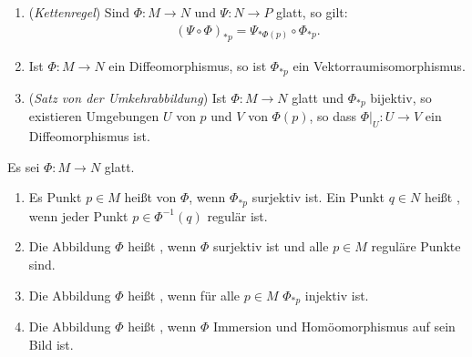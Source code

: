 \begin{emptythm}\hfill
  \begin{enumerate}[label=(\roman*),widest=iii]
  \item (\emph{Kettenregel}) Sind $\Phi \colon M \to N$ und $\Psi \colon N \to P$ glatt, so gilt:
    \begin{align*}
      (\Psi \circ \Phi)_{*p} = \Psi_{*\Phi(p)} \circ \Phi_{*p}.
    \end{align*}
  \item Ist $\Phi \colon M \to N$ ein Diffeomorphismus, so ist $\Phi_{*p}$ ein Vektorraumisomorphismus. %
  \item (\emph{Satz von der Umkehrabbildung}) Ist $\Phi \colon M \to N$ glatt und $\Phi_{*p}$ bijektiv, so existieren Umgebungen $U$ von $p$ und $V$ von $\Phi(p)$, so dass $\Phi|_{U} \colon U \to V$ ein Diffeomorphismus ist.
  \end{enumerate}
\end{emptythm}

\begin{Dfn}
  Es sei $\Phi \colon M \to N$ glatt.
  \begin{enumerate}[label=(\roman*),leftmargin=*,widest=iii]
  \item Es Punkt $p \in M$ heißt  von $\Phi$, wenn $\Phi_{*p}$ surjektiv ist. Ein Punkt $q \in N$ heißt , wenn jeder Punkt $p \in \Phi^{-1}(q)$ regulär ist.
  \item Die Abbildung $\Phi$ heißt , wenn $\Phi$ surjektiv ist und alle $p \in M$ reguläre Punkte sind.
  \item Die Abbildung $\Phi$ heißt , wenn für alle $p \in M$ $\Phi_{*p}$ injektiv ist.
  \item Die Abbildung $\Phi$ heißt , wenn $\Phi$ Immersion und Homöomorphismus auf sein Bild ist.
  \end{enumerate}
\end{Dfn}

